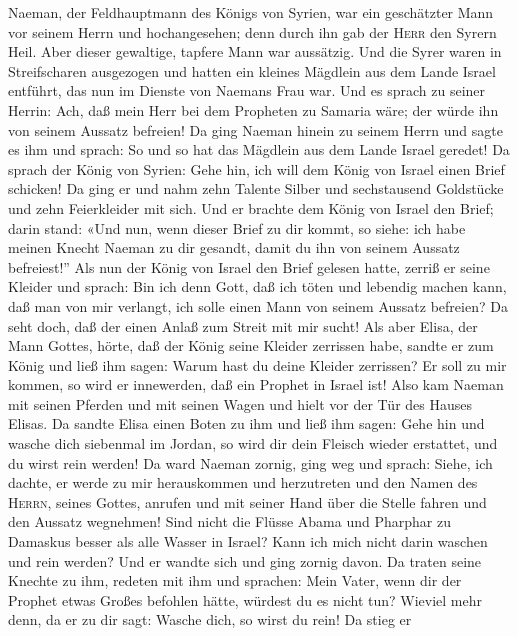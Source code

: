  Naeman, der Feldhauptmann des Königs von Syrien, war ein
geschätzter Mann vor seinem Herrn und hochangesehen; denn durch ihn gab
der \textsc{Herr} den Syrern Heil. Aber dieser gewaltige, tapfere Mann
war aussätzig.  Und die Syrer waren in Streifscharen
ausgezogen und hatten ein kleines Mägdlein aus dem Lande Israel
entführt, das nun im Dienste von Naemans Frau war.  Und es
sprach zu seiner Herrin: Ach, daß mein Herr bei dem Propheten zu Samaria
wäre; der würde ihn von seinem Aussatz befreien!  Da ging
Naeman hinein zu seinem Herrn und sagte es ihm und sprach: So und so hat
das Mägdlein aus dem Lande Israel geredet!  Da sprach der
König von Syrien: Gehe hin, ich will dem König von Israel einen Brief
schicken! Da ging er und nahm zehn Talente Silber und sechstausend
Goldstücke und zehn Feierkleider mit sich.  Und er brachte
dem König von Israel den Brief; darin stand: «Und nun, wenn dieser Brief
zu dir kommt, so siehe: ich habe meinen Knecht Naeman zu dir gesandt,
damit du ihn von seinem Aussatz befreiest!''  Als nun der
König von Israel den Brief gelesen hatte, zerriß er seine Kleider und
sprach: Bin ich denn Gott, daß ich töten und lebendig machen kann, daß
man von mir verlangt, ich solle einen Mann von seinem Aussatz befreien?
Da seht doch, daß der einen Anlaß zum Streit mit mir sucht!
 Als aber Elisa, der Mann Gottes, hörte, daß der König
seine Kleider zerrissen habe, sandte er zum König und ließ ihm sagen:
Warum hast du deine Kleider zerrissen? Er soll zu mir kommen, so wird er
innewerden, daß ein Prophet in Israel ist!  Also kam
Naeman mit seinen Pferden und mit seinen Wagen und hielt vor der Tür des
Hauses Elisas.  Da sandte Elisa einen Boten zu ihm und
ließ ihm sagen: Gehe hin und wasche dich siebenmal im Jordan, so wird
dir dein Fleisch wieder erstattet, und du wirst rein werden!
 Da ward Naeman zornig, ging weg und sprach: Siehe, ich
dachte, er werde zu mir herauskommen und herzutreten und den Namen des
\textsc{Herrn}, seines Gottes, anrufen und mit seiner Hand über die
Stelle fahren und den Aussatz wegnehmen!  Sind nicht die
Flüsse Abama und Pharphar zu Damaskus besser als alle Wasser in Israel?
Kann ich mich nicht darin waschen und rein werden? Und er wandte sich
und ging zornig davon.  Da traten seine Knechte zu ihm,
redeten mit ihm und sprachen: Mein Vater, wenn dir der Prophet etwas
Großes befohlen hätte, würdest du es nicht tun? Wieviel mehr denn, da er
zu dir sagt: Wasche dich, so wirst du rein!  Da stieg er
